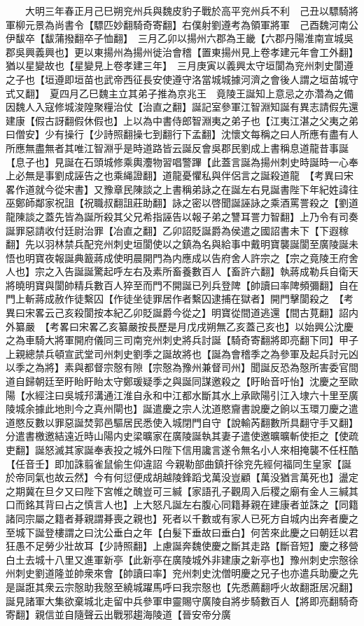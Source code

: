 　　大明三年春正月己巳朔兖州兵與魏皮豹子戰於高平兖州兵不利　己丑以驃騎將軍柳元景為尚書令【驃匹妙翻騎奇寄翻】右僕射劉遵考為領軍將軍　己酉魏河南公伊馛卒【馛蒲撥翻卒子恤翻】　三月乙卯以揚州六郡為王畿【六郡丹陽淮南宣城吳郡吳興義興也】更以東揚州為揚州徙治會稽【置東揚州見上卷孝建元年會工外翻】猶以星變故也【星變見上卷孝建三年】　三月庚寅以義興太守垣閬為兖州刺史閬遵之子也【垣遵即垣苗也武帝西征長安使遵守洛當城城據河濟之會後人謂之垣苗城守式又翻】　夏四月乙巳魏主立其弟子推為京兆王　竟陵王誕知上意忌之亦濳為之備因魏人入寇修城浚隍聚糧治仗【治直之翻】誕記室參軍江智淵知誕有異志請假先還建康【假古訝翻假休假也】上以為中書侍郎智淵夷之弟子也【江夷江湛之父夷之弟曰僧安】少有操行【少詩照翻操七到翻行下孟翻】沈懷文每稱之曰人所應有盡有人所應無盡無者其唯江智淵乎是時道路皆云誕反會吳郡民劉成上書稱息道龍昔事誕【息子也】見誕在石頭城修乘輿灋物習唱警蹕【此蓋言誕為揚州刺史時誕時一心奉上必無是事劉成誣告之也乘䋲證翻】道龍憂懼私與伴侶言之誕殺道龍　【考異曰宋畧作道就今從宋書】又豫章民陳談之上書稱弟詠之在誕左右見誕書陛下年紀姓諱往巫鄭師鄰家祝詛【祝職叔翻詛莊助翻】詠之密以啓聞誕誣詠之乘酒罵詈殺之【劉道龍陳談之蓋先皆為誕所殺其父兄希指誣告以報子弟之讐耳詈力智翻】上乃令有司奏誕罪惡請收付廷尉治罪【冶直之翻】乙卯詔貶誕爵為侯遣之國詔書未下【下遐稼翻】先以羽林禁兵配兖州刺史垣閬使以之鎮為名與給事中戴明寶襲誕閬至廣陵誕未悟也明寶夜報誕典籖蔣成使明晨開門為内應成以告府舍人許宗之【宗之竟陵王府舍人也】宗之入告誕誕驚起呼左右及素所畜養數百人【畜許六翻】執蔣成勒兵自衛天將曉明寶與閬帥精兵數百人猝至而門不開誕已列兵登陴【帥讀曰率陴頻彌翻】自在門上斬蔣成赦作徒繫囚【作徒坐徒罪居作者繫囚逮捕在獄者】開門擊閬殺之　【考異曰宋畧云己亥殺閬按本紀乙卯貶誕爵今從之】明寶從間道逃還【間古莧翻】詔内外纂嚴　【考畧曰宋畧乙亥纂嚴按長歷是月戊戌朔無乙亥蓋己亥也】以始興公沈慶之為車騎大將軍開府儀同三司南兖州刺史將兵討誕【騎奇寄翻將即亮翻下同】甲子上親總禁兵頓宣武堂司州刺史劉季之誕故將也【誕為會稽季之為參軍及起兵討元凶以季之為將】素與都督宗慤有隙【宗慤為豫州兼督司州】聞誕反恐為慤所害委官間道自歸朝廷至盱眙盱眙太守鄭瑗疑季之與誕同謀邀殺之【盱眙音吁怡】沈慶之至歐陽【水經注曰吳城䢴溝通江淮自永和中江都水斷其水上承歐陽引江入埭六十里至廣陵城余據此地則今之真州閘也】誕遣慶之宗人沈道愍齎書說慶之餉以玉環刀慶之遣道愍反數以罪惡誕焚郭邑驅居民悉使入城閉門自守【說輸芮翻數所具翻守手又翻】分遣書檄邀結遠近時山陽内史梁曠家在廣陵誕執其妻子遣使邀曠曠斬使拒之【使疏吏翻】誕怒滅其家誕奉表投之城外曰陛下信用讒言遂令無名小人來相掩襲不任枉酷【任音壬】即加誅翦雀鼠偷生仰違詔今親勒部曲鎮扞徐兖先經何福同生皇家【誕於帝同氣也故云然】今有何愆便成胡越陵鋒蹈戈萬没豈顧【萬没猶言萬死也】盪定之期冀在旦夕又曰陛下宮帷之醜豈可三緘【家語孔子觀周入后稷之廟有金人三緘其口而銘其背曰占之慎言人也】上大怒凡誕左右腹心同籍朞親在建康者並誅之【同籍諸同宗屬之籍者朞親謂朞喪之親也】死者以千數或有家人已死方自城内出奔者慶之至城下誕登樓謂之曰沈公垂白之年【白髮下垂故曰垂白】何苦來此慶之曰朝廷以君狂愚不足勞少壯故耳【少詩照翻】上慮誕奔魏使慶之斷其走路【斷音短】慶之移營白土去城十八里又進軍新亭【此新亭在廣陵城外非建康之新亭也】豫州刺史宗慤徐州刺史劉道隆並帥衆來會【帥讀曰率】兖州刺史沈僧明慶之兄子也亦遣兵助慶之先是誕誑其衆云宗慤助我慤至繞城躍馬呼曰我宗慤也【先悉薦翻呼火故翻誑居况翻】誕見諸軍大集欲棄城北走留中兵參軍申靈賜守廣陵自將步騎數百人【將即亮翻騎奇寄翻】親信並自隨聲云出戰邪趨海陵道【晉安帝分廣